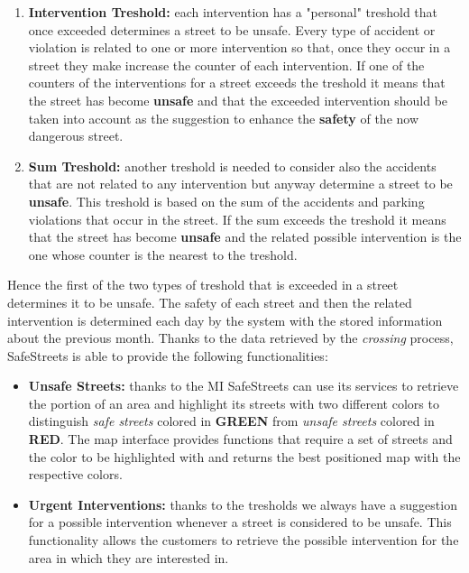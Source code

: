 		\begin{enumerate}
			\item \textbf{Intervention Treshold:} each intervention has a "personal" treshold that once exceeded determines a street to be unsafe. Every type of accident or violation is related to one or more intervention so that, once they occur in a street they make increase the counter of each intervention. If one of the counters of the interventions for a street exceeds the treshold it means that the street has become \textbf{unsafe} and that the exceeded intervention should be taken into account as the suggestion to enhance the \textbf{safety} of the now dangerous street.
			
			\item \textbf{Sum Treshold:} another treshold is needed to consider also the accidents that are not related to any intervention but anyway determine a street to be \textbf{unsafe}. This treshold is based on the sum of the accidents and parking violations that occur in the street. If the sum exceeds the treshold it means that the street has become \textbf{unsafe} and the related possible intervention is the one whose counter is the nearest to the treshold.
		\end{enumerate}
	
		Hence the first of the two types of treshold that is exceeded in a street determines it to be unsafe.
		The safety of each street and then the related intervention is determined each day by the system with the stored information about the previous month. Thanks to the data retrieved by the \emph{crossing} process, SafeStreets is able to provide the following functionalities:
		
		 \begin{itemize}
		 	\item \textbf{Unsafe Streets:} thanks to the MI SafeStreets can use its services to retrieve the portion of an area and highlight its streets with two different colors to distinguish \emph{safe streets} colored in \textbf{GREEN} from \emph{unsafe streets} colored in \textbf{RED}. The map interface provides functions that require a set of streets and the color to be highlighted with and returns the best positioned map with the respective colors. 
		 	
		 	\item \textbf{Urgent Interventions:} thanks to the tresholds we always have a suggestion for a possible intervention whenever a street is considered to be unsafe. This functionality allows the customers to retrieve the possible intervention for the area in which they are interested in.
		 \end{itemize}
	 
